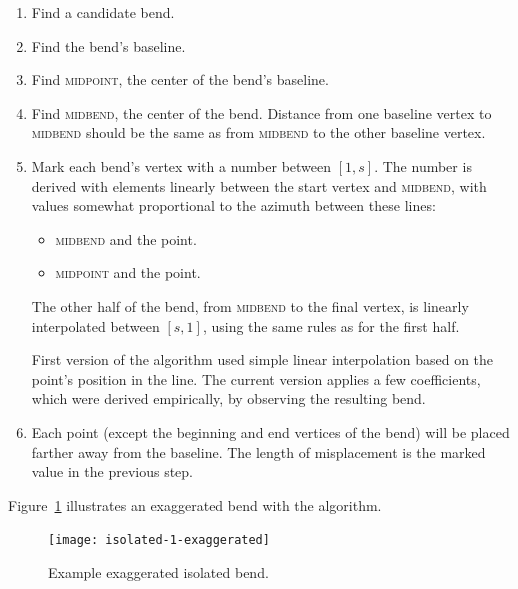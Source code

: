\documentclass[a4paper]{article}
\begin{document}
\begin{enumerate}
    \item Find a candidate bend.
    \item Find the bend's baseline.
    \item Find \textsc{midpoint}, the center of the bend's baseline.

    \item Find \textsc{midbend}, the center of the bend. Distance from one
        baseline vertex to \textsc{midbend} should be the same as from
        \textsc{midbend} to the other baseline vertex.

    \item Mark each bend's vertex with a number between $[1,s]$. The number is
        derived with elements linearly between the start vertex and
        \textsc{midbend}, with values somewhat proportional to the azimuth
        between these lines:

        \begin{itemize}
            \item \textsc{midbend} and the point.
            \item \textsc{midpoint} and the point.
        \end{itemize}

        The other half of the bend, from \textsc{midbend} to the final vertex,
        is linearly interpolated between $[s,1]$, using the same rules as for
        the first half.

        First version of the algorithm used simple linear interpolation based
        on the point's position in the line. The current version applies a few
        coefficients, which were derived empirically, by observing the
        resulting bend.

    \item Each point (except the beginning and end vertices of the bend) will
        be placed farther away from the baseline. The length of misplacement is
        the marked value in the previous step.

\end{enumerate}

Figure~\ref{fig:isolated-1-exaggerated} illustrates an exaggerated bend with
the algorithm.

\begin{figure}[ht]
    \centering
    \texttt{[image: isolated-1-exaggerated]}
    \caption{Example exaggerated isolated bend.}
    \label{fig:isolated-1-exaggerated}
\end{figure}
\end{document}
